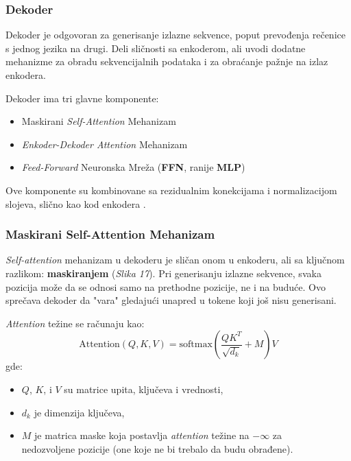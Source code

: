 \documentclass[12pt]{article}
\begin{document}
   \subsubsection{Dekoder}
   Dekoder je odgovoran za generisanje izlazne sekvence, poput prevođenja rečenice s jednog jezika 
   na drugi. Deli sličnosti sa enkoderom, ali uvodi dodatne mehanizme za obradu sekvencijalnih 
   podataka i za obraćanje pažnje na izlaz enkodera.

   Dekoder ima tri glavne komponente:
   \begin{itemize}
      \item Maskirani \textit{Self-Attention} Mehanizam
      \item \textit{Enkoder-Dekoder Attention} Mehanizam
      \item \textit{Feed-Forward} Neuronska Mreža (\textbf{FFN}, ranije \textbf{MLP})
   \end{itemize}

   Ove komponente su kombinovane sa rezidualnim konekcijama i 
   normalizacijom slojeva, slično kao kod enkodera \cite{trans_exp}.

   \subsubsection*{Maskirani Self-Attention Mehanizam}
   \textit{Self-attention} mehanizam u dekoderu je sličan onom u enkoderu, ali sa 
   ključnom razlikom: \textbf{maskiranjem} (\textit{Slika 17}). Pri generisanju izlazne sekvence, 
   svaka pozicija može da se odnosi samo na prethodne pozicije, ne i na buduće. 
   Ovo sprečava dekoder da "vara" gledajući unapred u tokene koji još nisu generisani.

   \textit{Attention} težine se računaju kao:
   \[
   \text{Attention}(Q, K, V) = \text{softmax}\left(\frac{QK^T}{\sqrt{d_k}} + M\right)V
   \]
   \vspace{-0.7cm}
   gde:
   \begin{itemize}
      \item \( Q \), \( K \), i \( V \) su matrice upita, ključeva i vrednosti,
      \item \( d_k \) je dimenzija ključeva,
      \item \( M \) je matrica maske koja postavlja \textit{attention} težine na
      $-\infty$ za \\ nedozvoljene pozicije (one koje ne bi trebalo da budu obrađene).
   \end{itemize}
\end{document}
